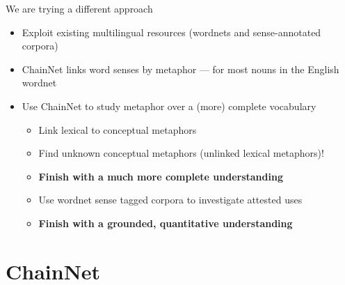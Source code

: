 \documentclass[xetex]{beamer}
\begin{document}
\begin{frame}{We are trying a different approach}
  \begin{itemize}
  \item Exploit existing multilingual resources (wordnets and sense-annotated corpora)
  \item ChainNet links word senses by metaphor --- for most nouns in the English wordnet
  \item Use ChainNet to study metaphor over a (more) complete vocabulary
    \begin{itemize}
    \item Link lexical to conceptual metaphors
    \item Find unknown conceptual metaphors (unlinked lexical metaphors)!
    \item \textbf{Finish with a much more complete understanding}
    \item Use wordnet sense tagged corpora to investigate attested uses
    \item \textbf{Finish with a grounded, quantitative understanding}
    \end{itemize}
  \end{itemize}
\end{frame}




\section{ChainNet}
\label{sec:chainnet}
\end{document}
